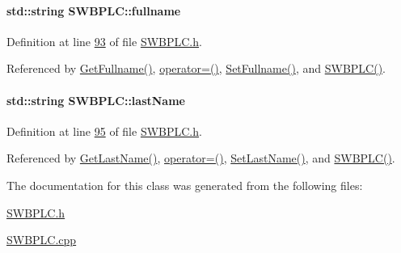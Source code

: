 \paragraph[{\texorpdfstring{fullname}{fullname}}]{\setlength{\rightskip}{0pt plus 5cm}std\+::string S\+W\+B\+P\+L\+C\+::fullname\hspace{0.3cm}{\ttfamily [private]}}\hypertarget{class_s_w_b_p_l_c_a5de90ba5cac0107fa5361458a0df839e_a5de90ba5cac0107fa5361458a0df839e}{}\label{class_s_w_b_p_l_c_a5de90ba5cac0107fa5361458a0df839e_a5de90ba5cac0107fa5361458a0df839e}


Definition at line \hyperlink{_s_w_b_p_l_c_8h_source_l00093}{93} of file \hyperlink{_s_w_b_p_l_c_8h_source}{S\+W\+B\+P\+L\+C.\+h}.



Referenced by \hyperlink{_s_w_b_p_l_c_8cpp_source_l00101}{Get\+Fullname()}, \hyperlink{_s_w_b_p_l_c_8h_source_l00063}{operator=()}, \hyperlink{_s_w_b_p_l_c_8cpp_source_l00097}{Set\+Fullname()}, and \hyperlink{_s_w_b_p_l_c_8h_source_l00024}{S\+W\+B\+P\+L\+C()}.

\paragraph[{\texorpdfstring{last\+Name}{lastName}}]{\setlength{\rightskip}{0pt plus 5cm}std\+::string S\+W\+B\+P\+L\+C\+::last\+Name\hspace{0.3cm}{\ttfamily [private]}}\hypertarget{class_s_w_b_p_l_c_aa06b2e569dd1fef8e43dfda1b34d67f3_aa06b2e569dd1fef8e43dfda1b34d67f3}{}\label{class_s_w_b_p_l_c_aa06b2e569dd1fef8e43dfda1b34d67f3_aa06b2e569dd1fef8e43dfda1b34d67f3}


Definition at line \hyperlink{_s_w_b_p_l_c_8h_source_l00095}{95} of file \hyperlink{_s_w_b_p_l_c_8h_source}{S\+W\+B\+P\+L\+C.\+h}.



Referenced by \hyperlink{_s_w_b_p_l_c_8cpp_source_l00085}{Get\+Last\+Name()}, \hyperlink{_s_w_b_p_l_c_8h_source_l00063}{operator=()}, \hyperlink{_s_w_b_p_l_c_8cpp_source_l00081}{Set\+Last\+Name()}, and \hyperlink{_s_w_b_p_l_c_8h_source_l00024}{S\+W\+B\+P\+L\+C()}.



The documentation for this class was generated from the following files\+:\begin{DoxyCompactItemize}
\item 
\hyperlink{_s_w_b_p_l_c_8h}{S\+W\+B\+P\+L\+C.\+h}\item 
\hyperlink{_s_w_b_p_l_c_8cpp}{S\+W\+B\+P\+L\+C.\+cpp}\end{DoxyCompactItemize}
